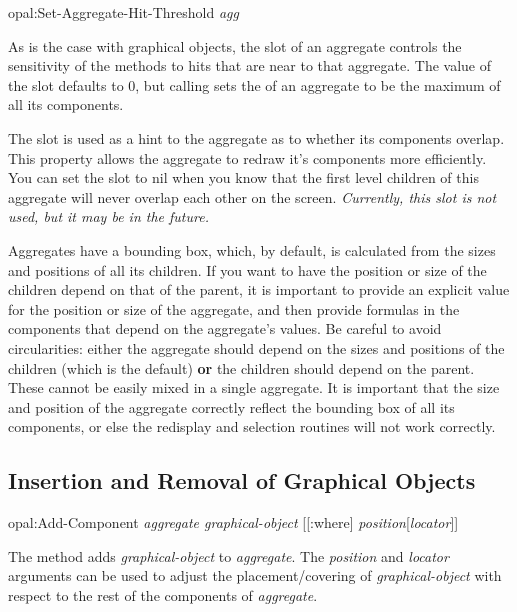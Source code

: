 \vspace{.5 line}
\begin{programexample}
opal:Set-Aggregate-Hit-Threshold {\it agg}\value{function}
\end{programexample}
\vspace{.5 line}
As is the case with graphical objects, the  slot of an
aggregate controls the sensitivity of the  methods to hits
that are near to that aggregate.  The value of the  slot
defaults to 0, but calling 
sets the  of an aggregate to be the maximum of all
its components.

The  slot is used as a hint to the aggregate as to whether
its components overlap.  This property allows the aggregate to redraw it's
components more efficiently.  You can set the  slot to {\sc nil}
when you know that the first level children of this aggregate will never
overlap each other on the screen.  {\it Currently, this slot is not used, but
it may be in the future.}

Aggregates have a bounding box, which, by default, is calculated from the
sizes and positions of all its children.  If you want to have the position
or size of the children depend on that of the parent, it is important to
provide an explicit value for the position or size of the aggregate, and
then provide formulas in the components that depend on the aggregate's
values.  Be careful to avoid circularities: either the aggregate should
depend on the sizes and positions of the children (which is the default)
{\bf or} the children should depend on the parent.  These cannot be easily
mixed in a single aggregate.  It is important that the size and position of
the aggregate correctly reflect the bounding box of all its components, or
else the redisplay and selection routines will not work correctly.


\begin{group}
\section{Insertion and Removal of Graphical Objects}
\label{addremsection}

\vspace{1 line}
\begin{programexample}
opal:Add-Component {\it aggregate graphical-object} [[:where] {\it position}[{\it locator}]]\value{method}
\end{programexample}

The method  adds {\it graphical-object} to {\it aggregate}.  The
{\it position} and {\it locator} arguments can be used to adjust the
placement/covering of {\it graphical-object} with respect to the rest of the
components of {\it aggregate}.
\end{group}
\vspace{1 line}


